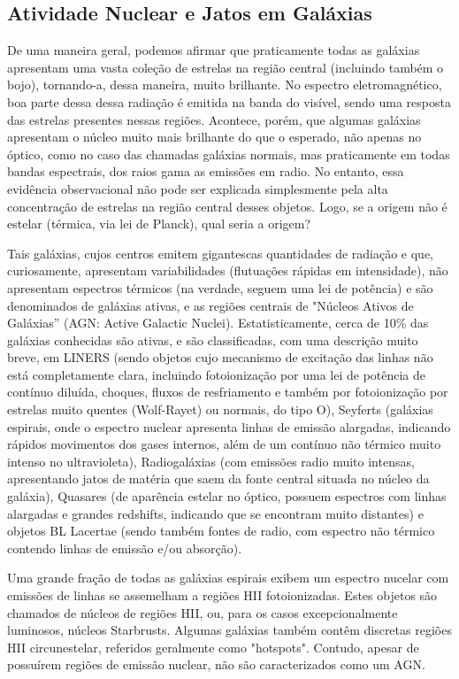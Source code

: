 \subsection{Atividade Nuclear e Jatos em Galáxias}

De uma maneira geral, podemos afirmar que praticamente todas as galáxias apresentam uma vasta coleção de estrelas na região central (incluindo também o bojo), tornando-a, dessa maneira, muito brilhante. No espectro eletromagnético, boa parte dessa dessa radiação é emitida na banda do visível, sendo uma resposta das estrelas presentes nessas regiões. Acontece, porém, que algumas galáxias apresentam o núcleo muito mais brilhante do que o esperado, não apenas no óptico, como no caso das chamadas galáxias normais,  
mas praticamente em todas bandas espectrais, dos raios gama as emissões em radio. No entanto, essa evidência observacional não pode ser explicada simplesmente pela alta concentração de estrelas na região central desses objetos. Logo, se a origem não é estelar (térmica, via lei de Planck), qual seria a origem?

Tais galáxias, cujos centros emitem gigantescas quantidades de radiação e que, curiosamente, apresentam variabilidades (flutuações rápidas em intensidade), não apresentam espectros térmicos (na verdade, seguem uma lei de potência) e são denominados de galáxias ativas, e as regiões centrais de "Núcleos Ativos de Galáxias” (AGN: Active Galactic Nuclei). Estatisticamente, cerca de 10\%  das galáxias conhecidas são ativas, e são classificadas, com uma descrição muito breve, em LINERS (sendo objetos cujo mecanismo de excitação das linhas não está completamente clara, incluindo fotoionização por uma lei de potência de contínuo diluída, choques, fluxos de resfriamento e também por fotoionização por estrelas muito quentes (Wolf-Rayet) ou normais, do tipo O), Seyferts (galáxias espirais, onde o espectro nuclear apresenta linhas de emissão alargadas, indicando rápidos movimentos dos gases internos, além de um contínuo não térmico muito intenso no ultravioleta), Radiogaláxias (com emissões radio muito intensas, apresentando jatos de matéria que saem da fonte central situada no núcleo da galáxia), Quasares (de aparência estelar no óptico, possuem espectros com linhas alargadas e grandes redshifts, indicando que se encontram muito distantes) e objetos BL Lacertae (sendo também fontes de radio, com espectro não térmico contendo linhas de emissão e/ou absorção).

Uma grande fração de todas as galáxias espirais exibem um espectro nucelar com emissões de linhas se assemelham a regiões HII fotoionizadas. Estes objetos são chamados de núcleos de regiões HII, ou, para os casos excepcionalmente luminosos, núcleos Starbrusts. Algumas galáxias também contêm discretas regiões HII circunestelar, referidos geralmente como "hotspots". Contudo, apesar de possuírem regiões de emissão nuclear, não são caracterizados como um AGN.

